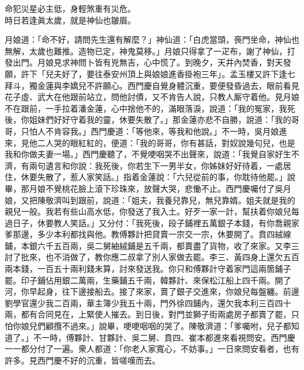 \begin{myquote} 
命犯災星必主低，身輕煞重有災危。\\時日若逢眞太歲，就是神仙也皺眉。
\end{myquote} 

月娘道：「命不好，請問先生還有解麼？」神仙道：「白虎當頭，䘮門坐命，神仙也無解，太歲也難推。造物已定，神鬼莫移。」月娘只得拿了一疋布，謝了神仙，打發出門。月娘見求神問卜皆有兇無吉，心中慌了。到晚夕，天井內焚香，對天發願，許下「兒夫好了，要往泰安州頂上與娘娘進香掛袍三年」。孟玉樓又許下逢七拜斗，{}獨金蓮與李嬌兒不許願心。{}西門慶自覺身體沉重，要便發昏過去，眼前看見花子虛、武大在他跟前站立，問他討債，又不肯告人說，只教人厮守着他。見月娘不在跟前，一手拉着潘金蓮，心中捨他不的，滿眼落淚，說道：「我的冤家，我死後，你姐妹們好好守着我的靈，休要失散了。」{}那金蓮亦悲不自勝，說道：「我的哥哥，只怕人不肯容我。」西門慶道：「等他來，等我和他說。」不一時，吳月娘進來，見他二人哭的眼紅紅的，便道：「我的哥哥，你有甚話，對奴說幾句兒，也是我和你做夫妻一場。」{}西門慶聽了，不覺哽咽哭不出聲來，說道：「我覺自家好生不濟，有兩句遺言和你說：我死後，你若生下一男半女，你姊妹好好待着，一處居住，休要失散了，惹人家笑話。」指着金蓮說：「六兒從前的事，你耽待他罷。」說畢，那月娘不覺桃花臉上滾下珍珠來，放聲大哭，悲慟不止。西門慶囑付了吳月娘，又把陳敬濟叫到跟前，說道：「姐夫，我養兒靠兒，無兒靠婿。姐夫就是我的親兒一般。{}我若有些山高水低，你發送了我入土。好歹一家一計，幫扶着你娘兒每過日子，休要教人笑話。」又分付：「我死後，段子鋪裡五萬銀子本錢，有你喬親家爹那邊，多少本利都找與他。教傅夥計把貸賣一宗交一宗，休要開了。賁四絨線鋪，本銀六千五百兩，吳二舅紬絨鋪是五千兩，都賣盡了貨物，收了來家。又李三討了批來，也不消做了，教你應二叔拿了別人家做去罷。李三、黃四身上還欠五百兩本錢，一百五十兩利錢未算，討來發送我。你只和傅夥計守着家門這兩箇鋪子罷。印子鋪佔用銀二萬兩，生藥鋪五千兩，韓夥計、來保松江船上四千兩。開了河，你早起身，往下邊接船去。接了來家，賣了銀子交進來，你娘兒每盤纏。前邊劉學官還少我二百兩，華主簿少我五十兩，門外徐四鋪內，還欠我本利三百四十兩，都有合同見在，上緊使人摧去。到日後，對門並獅子街兩處房子都賣了罷，只怕你娘兒們顧攬不過來。」說畢，哽哽咽咽的哭了。{}陳敬濟道：「爹囑咐，兒子都知道了。」不一時，傅夥計、甘夥計、吳二舅、賁四、崔本都進來看視問安。西門慶一一都分付了一遍。衆人都道：「你老人家寬心，不妨事。」一日來問安看者，也有許多。見西門慶不好的沉重，皆嗟嘆而去。

